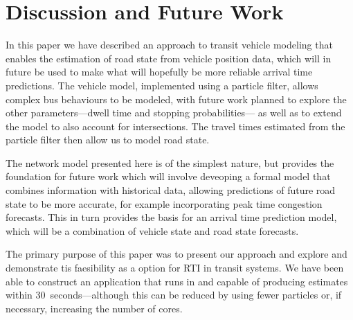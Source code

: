 \section{Discussion and Future Work}
\label{sec:discussion}

In this paper we have described an approach to transit vehicle modeling
that enables the \rt estimation of road state from vehicle position data,
which will in future be used to make what will hopefully be more reliable 
arrival time predictions.
The vehicle model, implemented using a particle filter,
allows complex bus behaviours to be modeled,
with future work planned to explore the other parameters---dwell time and stopping probabilities---%
as well as to extend the model to also account for intersections.
The travel times estimated from the particle filter then allow us to model \rt road state.


The network model presented here is of the simplest nature,
but provides the foundation for future work which will involve
deveoping a formal model that combines \rt information with
historical data, allowing predictions of future road state to be more accurate,
for example incorporating peak time congestion forecasts.
This in turn provides the basis for an arrival time prediction model,
which will be a combination of vehicle state and road state forecasts.


The primary purpose of this paper was to present our approach and 
explore and demonstrate tis faesibility as a \rt option for RTI in transit systems.
We have been able to construct an application that runs in \rt and capable
of producing estimates within 30~seconds---although this can be reduced 
by using fewer particles or, if necessary, increasing the number of cores.






